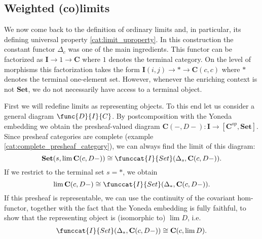 
\subsection{Weighted (co)limits}

    We now come back to the definition of ordinary limits and, in particular, its defining universal property \ref{cat:limit_uproperty}. In this construction the constant functor $\Delta_c$ was one of the main ingredients. This functor can be factorized as $\mathbf{I}\rightarrow1\rightarrow\mathbf{C}$ where $1$ denotes the terminal category. On the level of morphisms this factorization takes the form $\mathbf{I}(i, j)\rightarrow\ast\rightarrow\mathbf{C}(c, c)$ where $\ast$ denotes the terminal one-element set. However, whenever the enriching context is not $\mathbf{Set}$, we do not necessarily have access to a terminal object.

    First we will redefine limits as representing objects. To this end let us consider a general diagram $\func{D}{I}{C}$. By postcomposition with the Yoneda embedding we obtain the presheaf-valued diagram $\mathbf{C}(-, D-):\mathbf{I}\rightarrow[\mathbf{C}^{op}, \mathbf{Set}]$. Since presheaf categories are complete (example \ref{cat:complete_presheaf_category}), we can always find the limit of this diagram: \[\mathbf{Set}(s, \lim\mathbf{C}(c, D-))\cong\funccat{I}{Set}(\Delta_s, \mathbf{C}(c, D-)).\] If we restrict to the terminal set $s=\ast$, we obtain \[\lim\mathbf{C}(c, D-)\cong\funccat{I}{Set}(\Delta_\ast, \mathbf{C}(c, D-)).\] If this presheaf is representable, we can use the continuity of the covariant hom-functor, together with the fact that the Yoneda embedding is fully faithful, to show that the representing object is (isomorphic to) $\lim D$, i.e.
    \begin{gather}
        \funccat{I}{Set}(\Delta_\ast, \mathbf{C}(c, D-))\cong\mathbf{C}(c, \lim D).
    \end{gather}

